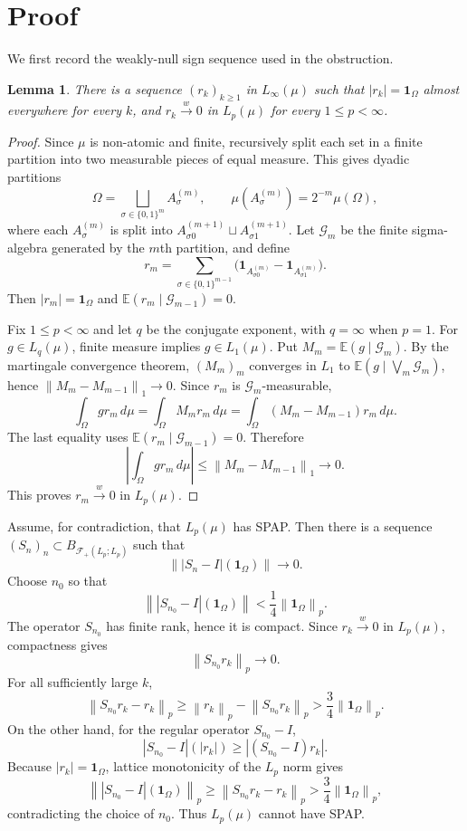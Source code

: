 \documentclass[11pt]{article}
\newtheorem{lemma}{Lemma}
\newcommand{\norm}[1]{\left\lVert #1 \right\rVert}
\newcommand{\weak}{\xrightarrow{w}}
\newcommand{\one}{\mathbf{1}}
\begin{document}
\section*{Proof}

We first record the weakly-null sign sequence used in the obstruction.

\begin{lemma}
There is a sequence $(r_k)_{k\ge1}$ in $L_\infty(\mu)$ such that
$|r_k|=\one_\Omega$ almost everywhere for every $k$, and
$r_k\weak 0$ in $L_p(\mu)$ for every $1\le p<\infty$.
\end{lemma}

\begin{proof}
Since $\mu$ is non-atomic and finite, recursively split each set in a
finite partition into two measurable pieces of equal measure. This gives
dyadic partitions
\[
  \Omega=\bigsqcup_{\sigma\in\{0,1\}^m} A_\sigma^{(m)},\qquad
  \mu(A_\sigma^{(m)})=2^{-m}\mu(\Omega),
\]
where each $A_\sigma^{(m)}$ is split into
$A_{\sigma0}^{(m+1)}\sqcup A_{\sigma1}^{(m+1)}$. Let $\mathcal G_m$ be
the finite sigma-algebra generated by the $m$th partition, and define
\[
  r_m=\sum_{\sigma\in\{0,1\}^{m-1}}
       \big(\one_{A_{\sigma0}^{(m)}}-\one_{A_{\sigma1}^{(m)}}\big).
\]
Then $|r_m|=\one_\Omega$ and
$\mathbb E(r_m\mid\mathcal G_{m-1})=0$.

Fix $1\le p<\infty$ and let $q$ be the conjugate exponent, with
$q=\infty$ when $p=1$. For $g\in L_q(\mu)$, finite measure implies
$g\in L_1(\mu)$. Put $M_m=\mathbb E(g\mid\mathcal G_m)$. By the
martingale convergence theorem, $(M_m)_m$ converges in $L_1$ to
$\mathbb E(g\mid\bigvee_m\mathcal G_m)$, hence
$\norm{M_m-M_{m-1}}_1\to0$. Since $r_m$ is $\mathcal G_m$-measurable,
\[
  \int_\Omega g r_m\,d\mu
  =\int_\Omega M_m r_m\,d\mu
  =\int_\Omega (M_m-M_{m-1})r_m\,d\mu.
\]
The last equality uses
$\mathbb E(r_m\mid\mathcal G_{m-1})=0$. Therefore
\[
  \left|\int_\Omega g r_m\,d\mu\right|
  \le \norm{M_m-M_{m-1}}_1\longrightarrow 0.
\]
This proves $r_m\weak 0$ in $L_p(\mu)$.
\end{proof}

Assume, for contradiction, that $L_p(\mu)$ has SPAP. Then there is a
sequence $(S_n)_n\subset B_{\mathcal F_+(L_p;L_p)}$ such that
\[
  \norm{|S_n-I|(\one_\Omega)}\longrightarrow 0.
\]
Choose $n_0$ so that
\[
  \norm{|S_{n_0}-I|(\one_\Omega)}
  <\frac14\norm{\one_\Omega}_p.
\]
The operator $S_{n_0}$ has finite rank, hence it is compact. Since
$r_k\weak0$ in $L_p(\mu)$, compactness gives
\[
  \norm{S_{n_0}r_k}_p\longrightarrow0.
\]
For all sufficiently large $k$,
\[
  \norm{S_{n_0}r_k-r_k}_p
  \ge \norm{r_k}_p-\norm{S_{n_0}r_k}_p
  >\frac34\norm{\one_\Omega}_p.
\]
On the other hand, for the regular operator $S_{n_0}-I$,
\[
  |S_{n_0}-I|(|r_k|)
  \ge |(S_{n_0}-I)r_k|.
\]
Because $|r_k|=\one_\Omega$, lattice monotonicity of the $L_p$ norm gives
\[
  \norm{|S_{n_0}-I|(\one_\Omega)}_p
  \ge \norm{S_{n_0}r_k-r_k}_p
  >\frac34\norm{\one_\Omega}_p,
\]
contradicting the choice of $n_0$. Thus $L_p(\mu)$ cannot have SPAP.
\end{document}

